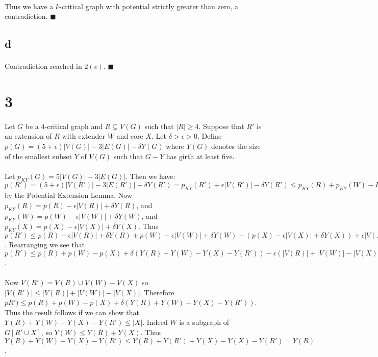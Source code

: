 \documentclass[letterpaper,12pt,oneside,onecolumn]{report}
\begin{document}
\paragraph{}
Thus we have a $k$-critical graph with potential strictly greater than zero, a contradiction. $\blacksquare$
\subsection*{d}
\paragraph{}
Contradiction reached in $2(c)$. $\blacksquare$

\section*{3}
\paragraph{}
Let $G$ be a $4$-critical graph and $R \subsetneq V(G)$ such that $|R| \geq 4$. Suppose that $R'$ is an extension of $R$ with extender $W$ and core $X$. Let $\delta > \epsilon > 0$. Define $p(G) = (5 + \epsilon)|V(G)| - 3|E(G)| - \delta Y(G)$ where $Y(G)$ denotes the size of the smallest subset $Y$ of $V(G)$ such that $G-Y$ has girth at least five. 
\paragraph{}
Let $p_{KY}(G) = 5|V(G)| - 3|E(G)|$. Then we have: $p(R') = (5 + \epsilon)|V(R')| - 3|E(R')| - \delta Y(R') = p_{KY}(R') + \epsilon |V(R')| - \delta Y(R') \leq p_{KY}(R) + p_{KY}(W) -P_{KY}(X) + \epsilon|V(R')| - \delta Y(R')$ by the Potential Extension Lemma. Now $p_{KY}(R) = p(R) - \epsilon|V(R)| + \delta Y(R)$, and $p_{KY}(W) = p(W) - \epsilon|V(W)| + \delta Y(W)$, and $p_{KY}(X) = p(X) - \epsilon|V(X)| + \delta Y(X)$. Thus $p(R') \leq p(R) - \epsilon|V(R)| + \delta Y(R) + p(W) - \epsilon|V(W)| + \delta Y(W) - (p(X) - \epsilon|V(X)| + \delta Y(X)) + \epsilon|V(R')| -\delta Y(R')$. Rearranging we see that $p(R') \leq  p(R) + p(W) - p(X) + \delta (Y(R) + Y(W) - Y(X) - Y(R')) - \epsilon(|V(R)| + |V(W)| - |V(X)| - |V(R')|)$.
\paragraph{}
Now $V(R') = V(R) \cup V(W) - V(X)$ so $|V(R')| \leq |V(R)| + |V(W)| - |V(X)|$. Therefore $pR') \leq  p(R) + p(W) - p(X) + \delta (Y(R) + Y(W) - Y(X) - Y(R'))$. Thus the result follows if we can show that $Y(R) + Y(W) - Y(X) - Y(R') \leq |X|$. Indeed $W$ is a subgraph of $G[R' \cup X]$, so $Y(W) \leq Y(R) + Y(X)$. Thus $Y(R) + Y(W) - Y(X) - Y(R') \leq Y(R) + Y(R') + Y(X) - Y(X) - Y(R') = Y(R)$.
\end{document}
